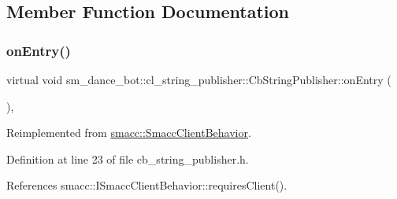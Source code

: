 \subsection{Member Function Documentation}
\mbox{\label{classsm__dance__bot_1_1cl__string__publisher_1_1CbStringPublisher_a7aa533578e820ee90d92d15b85d42e9b}} 
\subsubsection{\texorpdfstring{on\+Entry()}{onEntry()}}
{\footnotesize\ttfamily virtual void sm\+\_\+dance\+\_\+bot\+::cl\+\_\+string\+\_\+publisher\+::\+Cb\+String\+Publisher\+::on\+Entry (\begin{DoxyParamCaption}{ }\end{DoxyParamCaption})\hspace{0.3cm}{\ttfamily [inline]}, {\ttfamily [virtual]}}



Reimplemented from \hyperlink{classsmacc_1_1SmaccClientBehavior_ad5d3e1f1697c3cfe66c94cadba948493}{smacc\+::\+Smacc\+Client\+Behavior}.



Definition at line 23 of file cb\+\_\+string\+\_\+publisher.\+h.



References smacc\+::\+I\+Smacc\+Client\+Behavior\+::requires\+Client().


